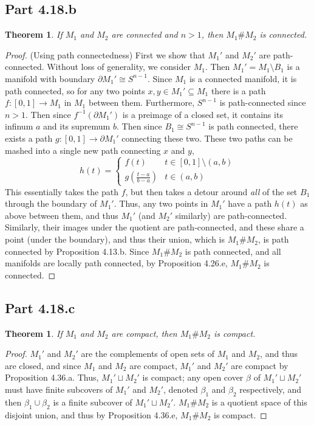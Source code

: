 \documentclass{article}
\newtheorem{theorem}[subsection]{Theorem}
\theoremstyle{definition}
\newcommand{\p}[1]{\left(#1\right)}
\begin{document}
\subsection{Part 4.18.b}
\begin{theorem}
If $M_1$ and $M_2$ are connected and $n>1$, then $M_1 \# M_2$ is connected.
\end{theorem}
\begin{proof} (Using path connectedness)
First we show that $M_1'$ and $M_2'$ are path-connected. Without loss of generality,
we consider $M_1$. Then $M_1'=M_1 \setminus B_1$ is a manifold with boundary 
$\partial M_1' \cong S^{n-1}$. Since $M_1$ is a connected manifold, it is path connected,
so for any two points $x,y \in M_1' \subseteq M_1$ there is a path $f : [0,1] \to M_1$ 
in $M_1$ between them. Furthermore, $S^{n-1}$ is path-connected since $n>1$.
Then since $f^{-1}(\partial M_1')$ is a preimage of a closed set, it contains its
infinum $a$ and its supremum $b$. Then since $B_1 \cong S^{n-1}$ is path 
connected, there exists a path $g : [0,1] \to \partial M_1'$ connecting these two.
These two paths can be mashed into a single new path connecting $x$ and $y$,
\[
h(t) = \left\{ \begin{array}{cl}
f(t) & t \in [0,1] \setminus (a,b) \\
g\p{\frac{t-a}{b-a}} & t \in (a,b) 
\end{array} \right.
\]
This essentially takes the path $f$, but then takes a detour around \textit{all}
of the set $B_1$ through the boundary of $M_1'$. Thus, any two points in $M_1'$
have a path $h(t)$ as above between them, and thus $M_1'$ (and $M_2'$ similarly)
are path-connected. Similarly, their images under the quotient are path-connected, 
and these share a point (under the boundary), and thus their union, which is
$M_1 \# M_2$, is path connected by Proposition 4.13.b. Since $M_1 \# M_2$ is
path connected, and all manifolds are locally path connected, by Proposition 4.26.e, 
$M_1 \# M_2$ is connected.
\end{proof}
\subsection{Part 4.18.c}
\begin{theorem}
If $M_1$ and $M_2$ are compact, then $M_1 \# M_2$ is compact.
\end{theorem}
\begin{proof}
$M_1'$ and $M_2'$ are the complements of open sets of $M_1$ and $M_2$, and thus
are closed, and since $M_1$ and $M_2$ are compact, $M_1'$ and $M_2'$ are compact
by Proposition 4.36.a. Thus, $M_1' \sqcup M_2'$ is compact; any open cover $\beta$ 
of $M_1' \sqcup M_2'$ must have finite subcovers of $M_1'$ and $M_2'$, denoted
$\beta_1$ and $\beta_2$ respectively, and then $\beta_1 \cup \beta_2$ is a finite
subcover of $M_1' \sqcup M_2'$. $M_1 \# M_2$ is a quotient space of this disjoint
union, and thus by Proposition 4.36.e, $M_1 \# M_2$ is compact.
\end{proof}
\end{document}
